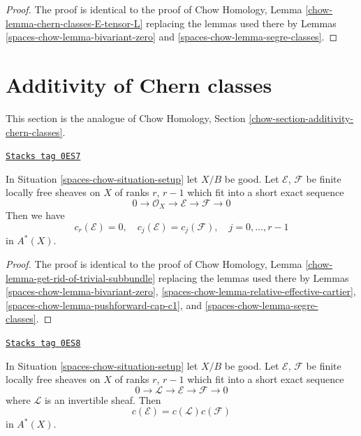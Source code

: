 \begin{proof}
The proof is identical to the proof of
Chow Homology, Lemma \ref{chow-lemma-chern-classes-E-tensor-L}
replacing the lemmas used there by Lemmas \ref{spaces-chow-lemma-bivariant-zero} and
\ref{spaces-chow-lemma-segre-classes}.
\end{proof}

\section{Additivity of Chern classes}
\label{spaces-chow-section-additivity-chern-classes}
This section is the analogue of Chow Homology, Section
\ref{chow-section-additivity-chern-classes}.

\begin{lemma}
\label{spaces-chow-lemma-get-rid-of-trivial-subbundle}
\href{https://stacks.math.columbia.edu/tag/0ES7}{\texttt{Stacks tag 0ES7}}

In Situation \ref{spaces-chow-situation-setup} let $X/B$ be good.
Let $\mathcal{E}$, $\mathcal{F}$ be finite locally free sheaves
on $X$ of ranks $r$, $r - 1$ which fit into a short
exact sequence
$$
0 \to \mathcal{O}_X \to \mathcal{E} \to \mathcal{F} \to 0
$$
Then we have
$$
c_r(\mathcal{E}) = 0, \quad
c_j(\mathcal{E}) = c_j(\mathcal{F}), \quad j = 0, \ldots, r - 1
$$
in $A^*(X)$.
\end{lemma}

\begin{proof}
The proof is identical to the proof of
Chow Homology, Lemma \ref{chow-lemma-get-rid-of-trivial-subbundle}
replacing the lemmas used there by
Lemmas \ref{spaces-chow-lemma-bivariant-zero},
\ref{spaces-chow-lemma-relative-effective-cartier},
\ref{spaces-chow-lemma-pushforward-cap-c1}, and
\ref{spaces-chow-lemma-segre-classes}.
\end{proof}

\begin{lemma}
\label{spaces-chow-lemma-additivity-invertible-subsheaf}
\href{https://stacks.math.columbia.edu/tag/0ES8}{\texttt{Stacks tag 0ES8}}

In Situation \ref{spaces-chow-situation-setup} let $X/B$ be good.
Let $\mathcal{E}$, $\mathcal{F}$ be finite locally free sheaves
on $X$ of ranks $r$, $r - 1$ which fit into a short
exact sequence
$$
0 \to \mathcal{L} \to \mathcal{E} \to \mathcal{F} \to 0
$$
where $\mathcal{L}$ is an invertible sheaf.
Then
$$
c(\mathcal{E}) = c(\mathcal{L}) c(\mathcal{F})
$$
in $A^*(X)$.
\end{lemma}

